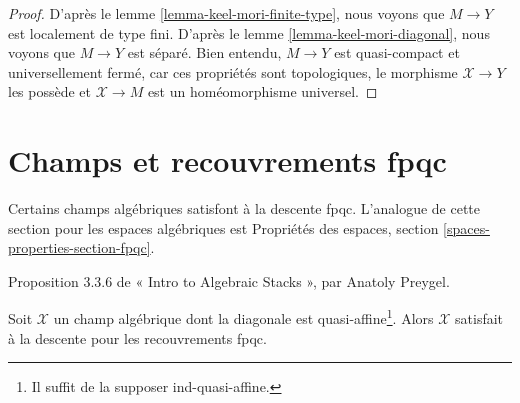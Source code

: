 \begin{proof}
D'après le lemme \ref{lemma-keel-mori-finite-type},
nous voyons que $M \to Y$ est localement de type fini.
D'après le lemme \ref{lemma-keel-mori-diagonal}, nous voyons que
$M \to Y$ est séparé.
Bien entendu, $M \to Y$ est quasi-compact et universellement fermé,
car ces propriétés sont topologiques, le morphisme $\mathcal{X} \to Y$
les possède et $\mathcal{X} \to M$ est un
homéomorphisme universel.
\end{proof}





\section{Champs et recouvrements fpqc}
\label{section-fpqc}

\noindent
Certains champs algébriques satisfont à la descente fpqc.
L'analogue de cette section pour les espaces algébriques
est Propriétés des espaces, section \ref{spaces-properties-section-fpqc}.


\begin{proposition}
\label{proposition-stack-fpqc}
\begin{reference}
Proposition 3.3.6 de « Intro to Algebraic Stacks », par
Anatoly Preygel.
\end{reference}
Soit $\mathcal{X}$ un champ algébrique dont la diagonale est quasi-affine\footnote{Il suffit
de la supposer ind-quasi-affine.}. Alors
$\mathcal{X}$ satisfait à la descente pour les recouvrements fpqc.
\end{proposition}

